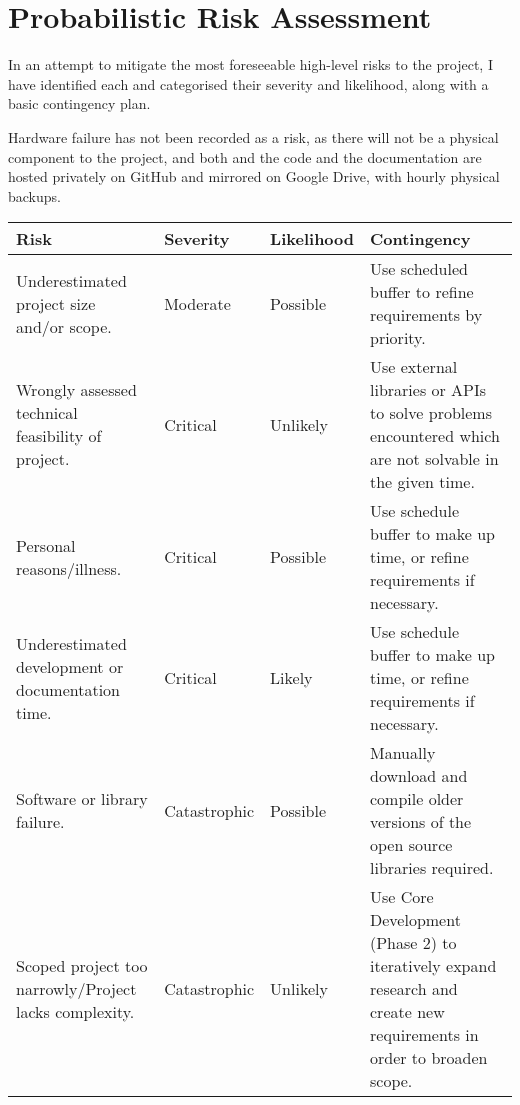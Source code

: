 \section{Probabilistic Risk Assessment}
In an attempt to mitigate the most foreseeable high-level risks to the project, I have identified each and categorised their severity and likelihood, along with a basic contingency plan.

Hardware failure has not been recorded as a risk, as there will not be a physical component to the project, and both and the code and the documentation are hosted privately on GitHub and mirrored on Google Drive, with hourly physical backups.\\

\begin{tabularx}{1\linewidth}{|X|l|l|X|}
\hline
Risk & Severity & Likelihood & Contingency \\
\hline
Underestimated project size and/or scope. 
& Moderate
& Possible
& Use scheduled buffer to refine requirements by priority. \\
\hline
Wrongly assessed technical feasibility of project. 
& Critical
& Unlikely
& Use external libraries or APIs to solve problems encountered which are not solvable in the given time. \\
\hline
Personal reasons/illness.
& Critical
& Possible
& Use schedule buffer to make up time, or refine requirements if necessary. \\
\hline
Underestimated development or documentation time. 
& Critical
& Likely
& Use schedule buffer to make up time, or refine requirements if necessary. \\
\hline
Software or library failure. 
& Catastrophic
& Possible
& Manually download and compile older versions of the open source libraries required. \\
\hline
Scoped project too narrowly/Project lacks complexity. 
& Catastrophic
& Unlikely
& Use Core Development (Phase 2) to iteratively expand research and create new requirements in order to broaden scope. \\
\hline

\end{tabularx}

